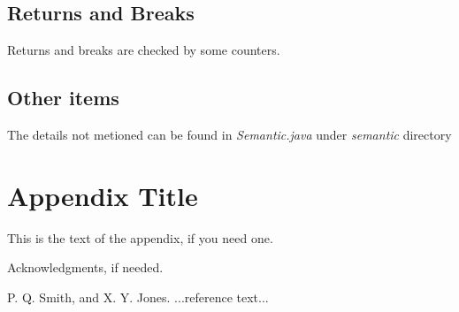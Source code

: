 \documentclass[nocopyrightspace]{sigplanconf}
\begin{document}
\subsection{Returns and Breaks}
	Returns and breaks are checked by some counters.

\subsection{Other items}
	The details not metioned can be found in \textit{Semantic.java} under \textit{semantic} directory

\appendix
\section{Appendix Title}

This is the text of the appendix, if you need one.

\acks

Acknowledgments, if needed.





\begin{thebibliography}{}
\softraggedright

P. Q. Smith, and X. Y. Jones. ...reference text...

\end{thebibliography}
\end{document}
